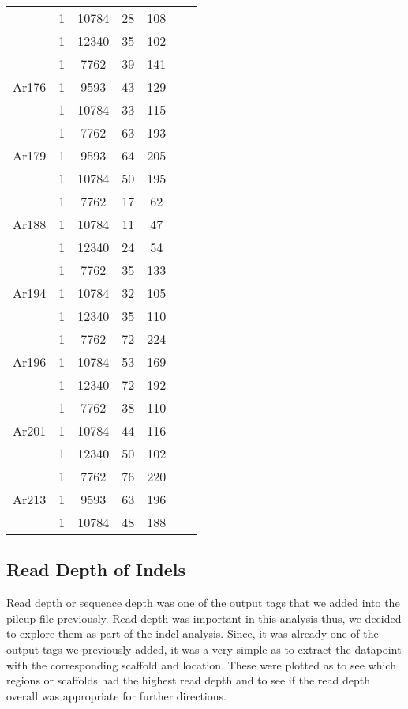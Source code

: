 \documentclass[12pt]{article}
\begin{document}
\begin{table}[H]
\begin{center}
\begin{singlespace}
{\begin{tabular}{ |c|c|c|c|c|c|c| }
					& 1 & 10784 & 28 & 108  \\ 
					& 1 & 12340 & 35 & 102 \\ 
					\hline
					\multirow{3}{4em}{Ar176} & 1 & 7762 & 39 & 141 \\ 
					& 1 & 9593 & 43 & 129  \\ 
					& 1 & 10784 & 33 & 115 \\ 
					\hline
					\multirow{3}{4em}{Ar179} & 1 & 7762 & 63 & 193 \\ 
					& 1 & 9593 & 64 & 205  \\ 
					& 1 & 10784 & 50 & 195 \\ 
					\hline
					\multirow{3}{4em}{Ar188} & 1 & 7762 & 17 & 62 \\ 
					& 1 & 10784 & 11 & 47  \\ 
					& 1 & 12340 & 24 & 54 \\ 
					\hline
					\multirow{3}{4em}{Ar194} & 1 & 7762 & 35 & 133 \\ 
					& 1 & 10784 & 32 & 105  \\ 
					& 1 & 12340 & 35 & 110 \\ 
					\hline
					\multirow{3}{4em}{Ar196} & 1 & 7762 & 72 & 224 \\ 
					& 1 & 10784 & 53 & 169  \\ 
					& 1 & 12340 & 72 & 192 \\ 
					\hline
					\multirow{3}{4em}{Ar201} & 1 & 7762 & 38 & 110 \\ 
					& 1 & 10784 & 44 & 116  \\ 
					& 1 & 12340 & 50 & 102 \\ 
					\hline
					\multirow{3}{4em}{Ar213} & 1 & 7762 & 76 & 220 \\ 
					& 1 & 9593 & 63 & 196  \\ 
					& 1 & 10784 & 48 & 188 \\ 
					\hline
				\end{tabular}
			}
		\end{singlespace}
	\end{center}
\end{table}

\subsection{Read Depth of Indels}

Read depth or sequence depth was one of the output tags that we added into the pileup file previously. Read depth was important in this analysis thus, we decided to explore them as part of the indel analysis. Since, it was already one of the output tags we previously added, it was a very simple as to extract the datapoint with the corresponding scaffold and location. These were plotted as to see which regions or scaffolds had the highest read depth and to see if the read depth overall was appropriate for further directions.
\end{document}
